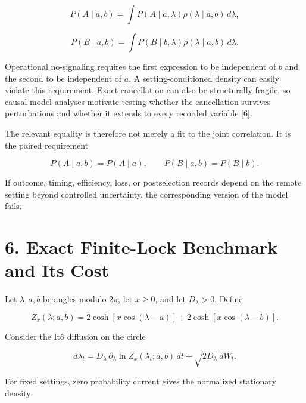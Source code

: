 \documentclass[
  american,
  11pt,
  letterpaper,
]{article}
\begin{document}
\begin{equation}
P(A\mid a,b)=\int P(A\mid a,\lambda)\rho(\lambda\mid a,b)\,d\lambda ,
\tag{2}
\end{equation}

\begin{equation}
P(B\mid a,b)=\int P(B\mid b,\lambda)\rho(\lambda\mid a,b)\,d\lambda .
\tag{3}
\end{equation}

Operational no-signaling requires the first expression to be independent of \(b\) and the second to be independent of \(a\). A setting-conditioned density can easily violate this requirement. Exact cancellation can also be structurally fragile, so causal-model analyses motivate testing whether the cancellation survives perturbations and whether it extends to every recorded variable {[}6{]}.

The relevant equality is therefore not merely a fit to the joint correlation. It is the paired requirement

\begin{equation}
P(A\mid a,b)=P(A\mid a),\qquad
P(B\mid a,b)=P(B\mid b).
\tag{4}
\end{equation}

If outcome, timing, efficiency, loss, or postselection records depend on the remote setting beyond controlled uncertainty, the corresponding version of the model fails.

\section{6. Exact Finite-Lock Benchmark and Its Cost}\label{exact-finite-lock-benchmark-and-its-cost}

Let \(\lambda,a,b\) be angles modulo \(2\pi\), let \(x\ge 0\), and let \(D_\lambda>0\). Define

\begin{equation}
Z_x(\lambda;a,b)=2\cosh\!\left[x\cos(\lambda-a)\right]
+2\cosh\!\left[x\cos(\lambda-b)\right].
\tag{5}
\end{equation}

Consider the Itô diffusion on the circle

\begin{equation}
d\lambda_t=D_\lambda\,\partial_\lambda\ln Z_x(\lambda_t;a,b)\,dt
+\sqrt{2D_\lambda}\,dW_t .
\tag{6}
\end{equation}

For fixed settings, zero probability current gives the normalized stationary density
\end{document}
